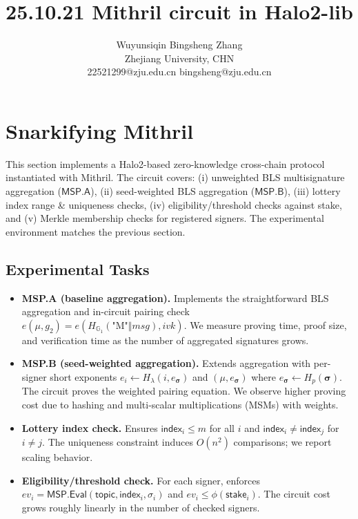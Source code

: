\documentclass{article}
\title{25.10.21 Mithril circuit in Halo2-lib }
\author{Wuyunsiqin \quad \quad Bingsheng Zhang \\ 
Zhejiang University, CHN \\
22521299@zju.edu.cn \quad bingsheng@zju.edu.cn}
\begin{document}
\maketitle



\section{Snarkifying Mithril }

This section implements a Halo2-based zero-knowledge cross-chain protocol instantiated with Mithril. The circuit covers: (i) unweighted BLS multisignature aggregation ($\mathsf{MSP.A}$), (ii) seed-weighted BLS aggregation ($\mathsf{MSP.B}$), (iii) lottery index range \& uniqueness checks, (iv) eligibility/threshold checks against stake, and (v) Merkle membership checks for registered signers. The experimental environment matches the previous section.

\subsection{Experimental Tasks}
\begin{itemize}
  \item \textbf{MSP.A (baseline aggregation).} Implements the straightforward BLS aggregation and in-circuit pairing check $e(\mu,g_2) = e(H_{\mathbb{G}_1}(\text{"M"}\Vert msg), ivk)$. We measure proving time, proof size, and verification time as the number of aggregated signatures grows.
  \item \textbf{MSP.B (seed-weighted aggregation).} Extends aggregation with per-signer short exponents $e_i \leftarrow H_\lambda(i,e_{\boldsymbol{\sigma}})$ and $(\mu,e_{\boldsymbol{\sigma}})$ where $e_{\boldsymbol{\sigma}}\leftarrow H_p(\boldsymbol{\sigma})$. The circuit proves the weighted pairing equation. We observe higher proving cost due to hashing and multi-scalar multiplications (MSMs) with weights.
  \item \textbf{Lottery index check.} Ensures $\mathsf{index}_i\!\le m$ for all $i$ and $\mathsf{index}_i\!\ne\!\mathsf{index}_j$ for $i\ne j$. The uniqueness constraint induces $O(n^2)$ comparisons; we report scaling behavior.
  \item \textbf{Eligibility/threshold check.} For each signer, enforces $ev_i=\mathsf{MSP.Eval}(\mathsf{topic},\mathsf{index}_i,\sigma_i)$ and $ev_i \le \phi(\mathsf{stake}_i)$. The circuit cost grows roughly linearly in the number of checked signers.
\end{itemize}
\end{document}
